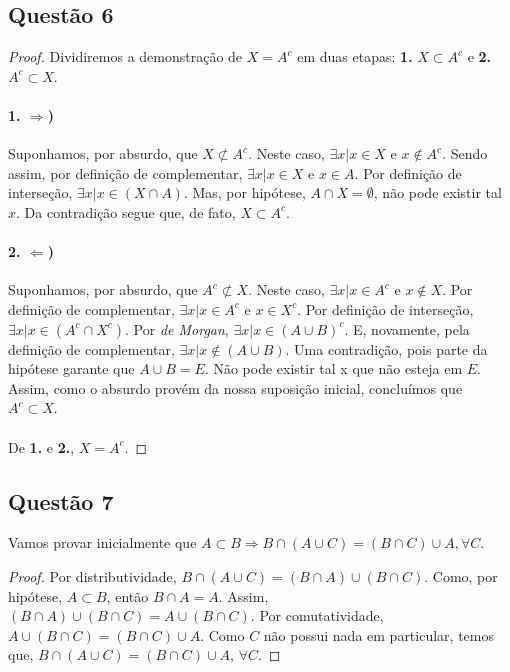 \documentclass[11pt,a4paper]{report}
\begin{document}
    \subsection{Questão 6}
    \begin{proof}
    Dividiremos a demonstração de $X = A^c$ em duas etapas: \textbf{1.} $X \subset A^c$ e \textbf{2.} $A^c \subset X$.

    \paragraph{1. $\Rightarrow$)}
    Suponhamos, por absurdo, que $X \not\subset A^c$. Neste caso, $\exists x | x \in X $ e $x \not\in A^c$. Sendo assim, por definição de complementar, $\exists x | x \in X$ e $x \in A$. Por definição de interseção, $\exists x | x \in (X \cap A)$. Mas, por hipótese, $A \cap X = \emptyset$, não pode existir tal $x$. Da contradição segue que, de fato, $X \subset A^c$.

    \paragraph{2. $\Leftarrow$)}
    Suponhamos, por absurdo, que $A^c \not\subset X$. Neste caso, $\exists x | x \in A^c$ e $x \not\in X$. Por definição de complementar, $\exists x | x \in A^c$ e $x \in X^c$. Por definição de interseção, $\exists x | x \in (A^c \cap X^c)$. Por \textit{de Morgan}, $\exists x | x \in (A \cup B)^c$. E, novamente, pela definição de complementar, $\exists x | x \not\in (A \cup B)$. Uma contradição, pois parte da hipótese garante que $A \cup B = E$. Não pode existir tal x que não esteja em $E$. Assim, como o absurdo provém da nossa suposição inicial, concluímos que $A^c \subset X$.

    \paragraph{}
    De \textbf{1.} e \textbf{2.}, $X = A^c$.
    \end{proof}


    \subsection{Questão 7}
    Vamos provar inicialmente que $A \subset B \Rightarrow B \cap (A \cup C) = (B \cap C) \cup A, \forall C$.

    \begin{proof}
    Por distributividade, $B \cap (A \cup C) = (B \cap A) \cup (B \cap C)$. Como, por hipótese, $A \subset B$, então $B \cap A = A$. Assim, $(B \cap A) \cup (B \cap C) = A \cup (B \cap C)$. Por comutatividade, $A \cup (B \cap C) = (B \cap C) \cup A$. Como $C$ não possui nada em particular, temos que, $B \cap (A \cup C) = (B \cap C) \cup A$, $\forall C$.
    \end{proof}
\end{document}
